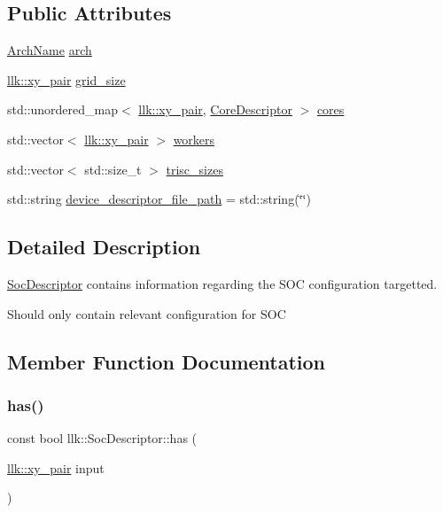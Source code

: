 \subsection*{Public Attributes}
\begin{DoxyCompactItemize}
\item 
\hyperlink{namespacellk_adb2574c7c85c75a2dfaf60853d0863d2}{Arch\+Name} \hyperlink{structllk_1_1SocDescriptor_afa6da3225e8cd0b2ee11c0a528440473}{arch}
\item 
\hyperlink{structllk_1_1xy__pair}{llk\+::xy\+\_\+pair} \hyperlink{structllk_1_1SocDescriptor_aaef203809f85ccd911090cdf489f7497}{grid\+\_\+size}
\item 
std\+::unordered\+\_\+map$<$ \hyperlink{structllk_1_1xy__pair}{llk\+::xy\+\_\+pair}, \hyperlink{structllk_1_1CoreDescriptor}{Core\+Descriptor} $>$ \hyperlink{structllk_1_1SocDescriptor_a282d153fb7d4f67282ecfb4f55e071a2}{cores}
\item 
std\+::vector$<$ \hyperlink{structllk_1_1xy__pair}{llk\+::xy\+\_\+pair} $>$ \hyperlink{structllk_1_1SocDescriptor_ae1702fbddb5fd95a4101ac5ee26f7bfb}{workers}
\item 
std\+::vector$<$ std\+::size\+\_\+t $>$ \hyperlink{structllk_1_1SocDescriptor_adc204a6ea10e5479ff099c9657cb2576}{trisc\+\_\+sizes}
\item 
std\+::string \hyperlink{structllk_1_1SocDescriptor_aeec3b8125d3e96fb862c444307b3a0e8}{device\+\_\+descriptor\+\_\+file\+\_\+path} = std\+::string(\char`\"{}\char`\"{})
\end{DoxyCompactItemize}


\subsection{Detailed Description}
\hyperlink{structllk_1_1SocDescriptor}{Soc\+Descriptor} contains information regarding the S\+OC configuration targetted. 

Should only contain relevant configuration for S\+OC 

\subsection{Member Function Documentation}
\mbox{\label{structllk_1_1SocDescriptor_a5c4fdff7e4fe3c2de5bb775f28da7940}} 
\subsubsection{\texorpdfstring{has()}{has()}}
{\footnotesize\ttfamily const bool llk\+::\+Soc\+Descriptor\+::has (\begin{DoxyParamCaption}\item[{\hyperlink{structllk_1_1xy__pair}{llk\+::xy\+\_\+pair}}]{input }\end{DoxyParamCaption})\hspace{0.3cm}{\ttfamily [inline]}}



